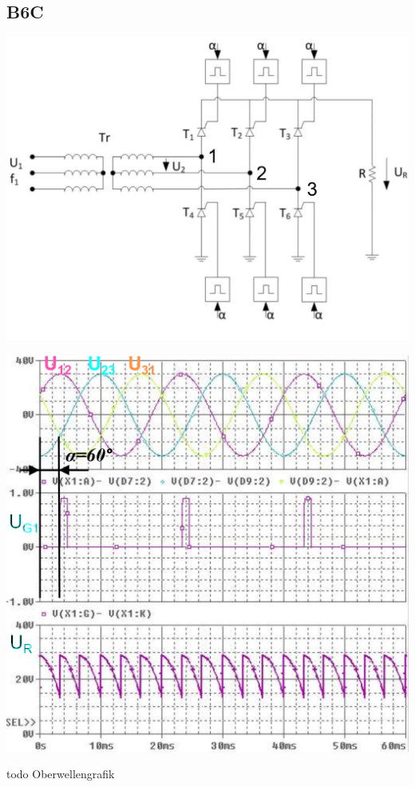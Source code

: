 \subsection{B6C}
\vspace{-0.5cm}
\begin{minipage}{0.4\linewidth}
    \includegraphics[width=0.8\linewidth]{images/GRB6c}
\end{minipage}
\begin{minipage}{0.35\linewidth}
    \centering 
    \includegraphics[width=0.8\linewidth]{images/B6CKl}
    
\end{minipage}
\begin{minipage}{0.25\linewidth}
   todo Oberwellengrafik %
\end{minipage}
\newline

\clearpage